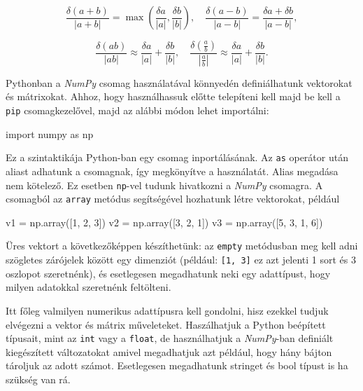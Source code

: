 \[
\frac{\delta(a+b)} {|a+b|} =  \max\left( \frac{\delta a}{|a|}, \frac{\delta b}{|b|} \right), \quad
\frac{\delta(a-b)} {|a-b|} = \frac{\delta a + \delta b} {|a-b|},
\]

\[
\frac{\delta(ab)} {|ab|} \approx \frac{\delta a}{|a|} + \frac{\delta b}{|b|}, \quad
\frac{\delta(\frac {a}{b})} {|\frac {a}{b}|} \approx \frac{\delta a}{|a|} + \frac{\delta b}{|b|}.
\]



Pythonban a \emph{NumPy} csomag használatával könnyedén definiálhatunk
vektorokat és mátrixokat. Ahhoz, hogy használhassuk előtte telepíteni
kell majd be kell a \texttt{pip} csomagkezelővel, majd az alábbi módon lehet
importálni:
\begin{python}
import numpy as np
\end{python}

Ez a szintaktikája Python-ban egy csomag inportálásának. Az \texttt{as}
operátor után aliast adhatunk a csomagnak, így megkönyítve a
használatát. Alias megadása nem kötelező.
Ez esetben \texttt{np}-vel tudunk hivatkozni a \emph{NumPy} csomagra. A csomagból az \texttt{array} metódus segítségével hozhatunk
létre vektorokat, például
\begin{python}
v1 = np.array([1, 2, 3])
v2 = np.array([3, 2, 1])
v3 = np.array([5, 3, 1, 6])
\end{python}

    Üres vektort a következőképpen készíthetünk: az \texttt{empty}
metódusban meg kell adni szögletes zárójelek között egy dimenziót
(például: \texttt{{[}1,\ 3{]}} ez azt jelenti 1 sort és 3 oszlopot
szeretnénk), és esetlegesen megadhatunk neki egy adattípust, hogy milyen
adatokkal szeretnénk feltölteni.

    Itt főleg valmilyen numerikus adattípusra kell gondolni, hisz ezekkel
tudjuk elvégezni a vektor és mátrix műveleteket. Haszálhatjuk a Python
beépített típusait, mint az \texttt{int} vagy a \texttt{float}, de
használhatjuk a \emph{NumPy}-ban definiált kiegészített változatokat
amivel megadhatjuk azt például, hogy hány bájton tároljuk az adott
számot. Esetlegesen megadhatunk stringet és bool típust is ha szükség
van rá.

